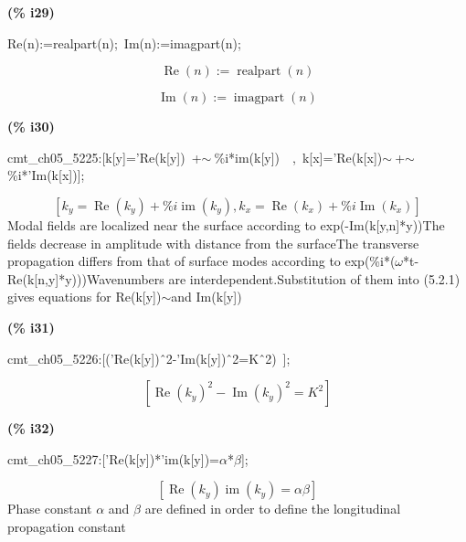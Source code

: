 \documentclass[fleqn]{article}
\begin{document}
\noindent
\begin{minipage}[t]{4.000000em}\color{red}\bfseries
(\% i29)	
\end{minipage}
\begin{minipage}[t]{\textwidth}\color{blue}
Re(n):=realpart(n);\ Im(n):=imagpart(n);
\end{minipage}
\[\displaystyle \tag{\% o28} 
\operatorname{Re}(n)\operatorname{:=}\operatorname{realpart}(n)\mbox{}\]

\[\tag{\% o29} 
\operatorname{Im}(n)\operatorname{:=}\operatorname{imagpart}(n)\mbox{}
\]


\noindent
\begin{minipage}[t]{4.000000em}\color{red}\bfseries
(\% i30)	
\end{minipage}
\begin{minipage}[t]{\textwidth}\color{blue}
cmt\_ch05\_5225:[k[y]='Re(k[y])\ +\ensuremath{\sim\ }\%i*im(k[y])\ \ ,\ k[x]='Re(k[x])\ensuremath{\sim\ }+\ensuremath{\sim\ }\%i*'Im(k[x])];
\end{minipage}
\[\displaystyle \tag{\% o30} 
\left[ {k_y}=\operatorname{Re}\left( {k_y}\right) +\% i \operatorname{im}\left( {k_y}\right) \operatorname{,}{k_x}=\operatorname{Re}\left( {k_x}\right) +\% i \operatorname{Im}\left( {k_x}\right) \right] \mbox{}
\]
Modal fields are localized near the surface according to exp(-Im(k[y,n]*y))The fields decrease in amplitude with distance from the surfaceThe transverse propagation differs from that of surface modes according to exp(\%i*(\ensuremath{\omega}*t-Re(k[n,y]*y)))Wavenumbers are interdependent.Substitution of them into (5.2.1) gives equations for Re(k[y])\ensuremath{\sim }and Im(k[y])


\noindent
\begin{minipage}[t]{4.000000em}\color{red}\bfseries
(\% i31)	
\end{minipage}
\begin{minipage}[t]{\textwidth}\color{blue}
cmt\_ch05\_5226:[('Re(k[y])\^\ 2-'Im(k[y])\^\ 2=K\^\ 2)\ ];
\end{minipage}
\[\displaystyle \tag{\% o31} 
\left[ {{\operatorname{Re}\left( {k_y}\right) }^{2}}-{{\operatorname{Im}\left( {k_y}\right) }^{2}}={{K}^{2}}\right] \mbox{}
\]


\noindent
\begin{minipage}[t]{4.000000em}\color{red}\bfseries
(\% i32)	
\end{minipage}
\begin{minipage}[t]{\textwidth}\color{blue}
cmt\_ch05\_5227:['Re(k[y])*'im(k[y])=\ensuremath{\alpha}*\ensuremath{\beta}];
\end{minipage}
\[\displaystyle \tag{\% o32} 
\left[ \operatorname{Re}\left( {k_y}\right)  \operatorname{im}\left( {k_y}\right) =\alpha  \beta \right] \mbox{}
\]
Phase constant \ensuremath{\alpha} and \ensuremath{\beta} are defined in order to define the longitudinal propagation constant
\end{document}
